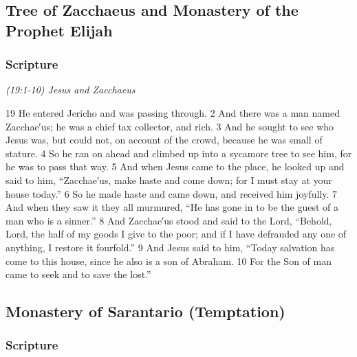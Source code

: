\documentclass[letterpaper]{report}
\begin{document}
\clearpage
\subsection{Tree of Zacchaeus and Monastery of the Prophet Elijah}
\begin{multicols}{2}
	\mbox{}
\end{multicols}
\subsubsection{Scripture}

{\centering
	\emph{(19:1-10) Jesus and Zacchaeus}\\
}
\begin{multicols}{2}
19 He entered Jericho and was passing through. 2 And there was a man named Zacchae′us; he was a chief tax collector, and rich. 3 And he sought to see who Jesus was, but could not, on account of the crowd, because he was small of stature. 4 So he ran on ahead and climbed up into a sycamore tree to see him, for he was to pass that way. 5 And when Jesus came to the place, he looked up and said to him, “Zacchae′us, make haste and come down; for I must stay at your house today.” 6 So he made haste and came down, and received him joyfully. 7 And when they saw it they all murmured, “He has gone in to be the guest of a man who is a sinner.” 8 And Zacchae′us stood and said to the Lord, “Behold, Lord, the half of my goods I give to the poor; and if I have defrauded any one of anything, I restore it fourfold.” 9 And Jesus said to him, “Today salvation has come to this house, since he also is a son of Abraham. 10 For the Son of man came to seek and to save the lost.”
\end{multicols}

\clearpage
\subsection{Monastery of Sarantario (Temptation)}
\begin{multicols}{2}
	\mbox{}
\end{multicols}
\subsubsection{Scripture}
\end{document}
